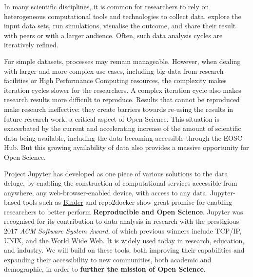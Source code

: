

\begin{draft}

In many scientific disciplines, it is common for researchers to rely on
heterogeneous computational tools and technologies to collect data, explore the
input data sets, run simulations, visualise the outcome, and share their result
with peers or with a larger audience. Often, such data analysis cycles are
iteratively refined.

For simple datasets, processes may remain manageable. However, when dealing with
larger and more complex use cases, including big data from research facilities
or High Performance Computing resources, the complexity makes iteration cycles
slower for the researchers. A complex iteration cycle also makes research
results more difficult to reproduce. Results that cannot be reproduced make
research ineffective: they create barriers towards re-using the results in
future research work, a critical aspect of Open Science. This situation is
exacerbated by the current and accelerating increase of the amount of scientific
data being available, including the data becoming accessible through the
EOSC-Hub. But this growing availability of data also provides a massive
opportunity for Open Science.

Project Jupyter has developed as one piece of various solutions to the data
deluge, by enabling the construction of computational services accessible from
anywhere, any web-browser-enabled device, with access to any data. Jupyter-based
tools such as \href{https://mybinder.org}{Binder} and repo2docker show great
promise for enabling researchers to better perform \textbf{Reproducible and Open
  Science}. Jupyter was recognised for its contribution to data analysis in
research with the prestigious 2017 \emph{ACM Software System Award}, of which
previous winners include TCP/IP, UNIX, and the World Wide Web. It is widely used
today in research, education, and industry. We will build on these tools, both
improving their capabilities and expanding their accessibility to new
communities, both academic and demographic, in order to \textbf{further the
  mission of Open Science}.


\end{draft}
